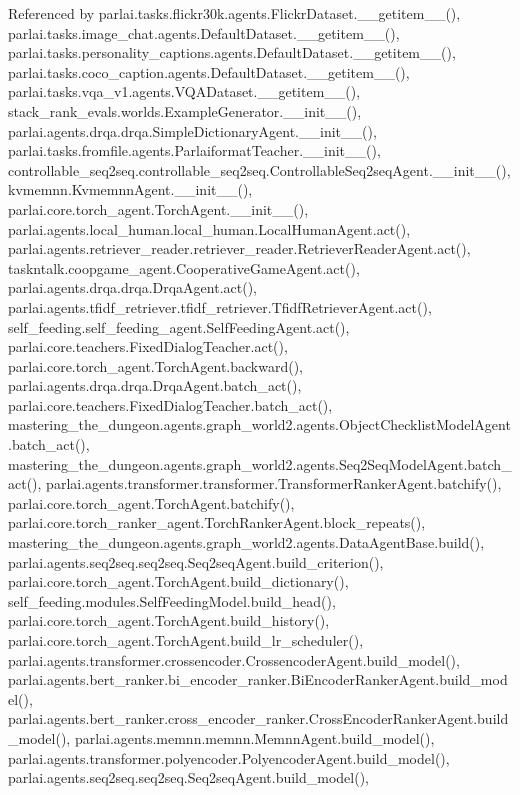 Referenced by parlai.\+tasks.\+flickr30k.\+agents.\+Flickr\+Dataset.\+\_\+\+\_\+getitem\+\_\+\+\_\+(), parlai.\+tasks.\+image\+\_\+chat.\+agents.\+Default\+Dataset.\+\_\+\+\_\+getitem\+\_\+\+\_\+(), parlai.\+tasks.\+personality\+\_\+captions.\+agents.\+Default\+Dataset.\+\_\+\+\_\+getitem\+\_\+\+\_\+(), parlai.\+tasks.\+coco\+\_\+caption.\+agents.\+Default\+Dataset.\+\_\+\+\_\+getitem\+\_\+\+\_\+(), parlai.\+tasks.\+vqa\+\_\+v1.\+agents.\+V\+Q\+A\+Dataset.\+\_\+\+\_\+getitem\+\_\+\+\_\+(), stack\+\_\+rank\+\_\+evals.\+worlds.\+Example\+Generator.\+\_\+\+\_\+init\+\_\+\+\_\+(), parlai.\+agents.\+drqa.\+drqa.\+Simple\+Dictionary\+Agent.\+\_\+\+\_\+init\+\_\+\+\_\+(), parlai.\+tasks.\+fromfile.\+agents.\+Parlaiformat\+Teacher.\+\_\+\+\_\+init\+\_\+\+\_\+(), controllable\+\_\+seq2seq.\+controllable\+\_\+seq2seq.\+Controllable\+Seq2seq\+Agent.\+\_\+\+\_\+init\+\_\+\+\_\+(), kvmemnn.\+Kvmemnn\+Agent.\+\_\+\+\_\+init\+\_\+\+\_\+(), parlai.\+core.\+torch\+\_\+agent.\+Torch\+Agent.\+\_\+\+\_\+init\+\_\+\+\_\+(), parlai.\+agents.\+local\+\_\+human.\+local\+\_\+human.\+Local\+Human\+Agent.\+act(), parlai.\+agents.\+retriever\+\_\+reader.\+retriever\+\_\+reader.\+Retriever\+Reader\+Agent.\+act(), taskntalk.\+coopgame\+\_\+agent.\+Cooperative\+Game\+Agent.\+act(), parlai.\+agents.\+drqa.\+drqa.\+Drqa\+Agent.\+act(), parlai.\+agents.\+tfidf\+\_\+retriever.\+tfidf\+\_\+retriever.\+Tfidf\+Retriever\+Agent.\+act(), self\+\_\+feeding.\+self\+\_\+feeding\+\_\+agent.\+Self\+Feeding\+Agent.\+act(), parlai.\+core.\+teachers.\+Fixed\+Dialog\+Teacher.\+act(), parlai.\+core.\+torch\+\_\+agent.\+Torch\+Agent.\+backward(), parlai.\+agents.\+drqa.\+drqa.\+Drqa\+Agent.\+batch\+\_\+act(), parlai.\+core.\+teachers.\+Fixed\+Dialog\+Teacher.\+batch\+\_\+act(), mastering\+\_\+the\+\_\+dungeon.\+agents.\+graph\+\_\+world2.\+agents.\+Object\+Checklist\+Model\+Agent.\+batch\+\_\+act(), mastering\+\_\+the\+\_\+dungeon.\+agents.\+graph\+\_\+world2.\+agents.\+Seq2\+Seq\+Model\+Agent.\+batch\+\_\+act(), parlai.\+agents.\+transformer.\+transformer.\+Transformer\+Ranker\+Agent.\+batchify(), parlai.\+core.\+torch\+\_\+agent.\+Torch\+Agent.\+batchify(), parlai.\+core.\+torch\+\_\+ranker\+\_\+agent.\+Torch\+Ranker\+Agent.\+block\+\_\+repeats(), mastering\+\_\+the\+\_\+dungeon.\+agents.\+graph\+\_\+world2.\+agents.\+Data\+Agent\+Base.\+build(), parlai.\+agents.\+seq2seq.\+seq2seq.\+Seq2seq\+Agent.\+build\+\_\+criterion(), parlai.\+core.\+torch\+\_\+agent.\+Torch\+Agent.\+build\+\_\+dictionary(), self\+\_\+feeding.\+modules.\+Self\+Feeding\+Model.\+build\+\_\+head(), parlai.\+core.\+torch\+\_\+agent.\+Torch\+Agent.\+build\+\_\+history(), parlai.\+core.\+torch\+\_\+agent.\+Torch\+Agent.\+build\+\_\+lr\+\_\+scheduler(), parlai.\+agents.\+transformer.\+crossencoder.\+Crossencoder\+Agent.\+build\+\_\+model(), parlai.\+agents.\+bert\+\_\+ranker.\+bi\+\_\+encoder\+\_\+ranker.\+Bi\+Encoder\+Ranker\+Agent.\+build\+\_\+model(), parlai.\+agents.\+bert\+\_\+ranker.\+cross\+\_\+encoder\+\_\+ranker.\+Cross\+Encoder\+Ranker\+Agent.\+build\+\_\+model(), parlai.\+agents.\+memnn.\+memnn.\+Memnn\+Agent.\+build\+\_\+model(), parlai.\+agents.\+transformer.\+polyencoder.\+Polyencoder\+Agent.\+build\+\_\+model(), parlai.\+agents.\+seq2seq.\+seq2seq.\+Seq2seq\+Agent.\+build\+\_\+model(), 
